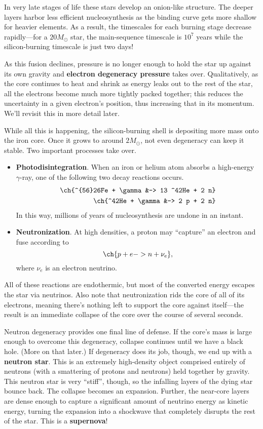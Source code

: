 \documentclass[../a062main.tex]{subfiles}
\begin{document}
In very late stages of life these stars develop an onion-like structure.
The deeper layers harbor less efficient nucleosynthesis as the binding curve gets more shallow for heavier elements.
As a result, the timescales for each burning stage decrease rapidly---for a $20M_\odot$ star, the main-sequence timescale is $10^{7}$ years while the silicon-burning timescale is just two days!

As this fusion declines, pressure is no longer enough to hold the star up against its own gravity and \textbf{electron degeneracy pressure} takes over.
Qualitatively, as the core continues to heat and shrink as energy leaks out to the rest of the star, all the electrons become much more tightly packed together; this reduces the uncertainty in a given electron's position, thus increasing that in its momentum.
We'll revisit this in more detail later.

While all this is happening, the silicon-burning shell is depositing more mass onto the iron core.
Once it grows to around $2M_\odot$, not even degeneracy can keep it stable.
Two important processes take over.
\begin{itemize}
    \item \textbf{Photodisintegration}.
    When an iron or helium atom absorbs a high-energy $\gamma$-ray, one of the following two decay reactions occurs.
    \begin{align*}
        \ch{^{56}26Fe + \gamma &-> 13 ^42He + 2 n} \\
        \ch{^42He + \gamma &-> 2 p + 2 n}
    \end{align*}
    In this way, millions of years of nucleosynthesis are undone in an instant.

    \item \textbf{Neutronization}.
    At high densities, a proton may ``capture'' an electron and fuse according to
    \[ \ch{p + e -> n + \nu_e}, \]
    where $\nu_e$ is an electron neutrino.
\end{itemize}
All of these reactions are endothermic, but most of the converted energy escapes the star via neutrinos.
Also note that neutronization rids the core of all of its electrons, meaning there's nothing left to support the core against itself---the result is an immediate collapse of the core over the course of several seconds.

Neutron degeneracy provides one final line of defense.
If the core's mass is large enough to overcome this degeneracy, collapse continues until we have a black hole.
(More on that later.)
If degeneracy does its job, though, we end up with a \textbf{neutron star}.
This is an extremely high-density object comprised entirely of neutrons (with a smattering of protons and neutrons) held together by gravity.
This neutron star is very ``stiff'', though, so the infalling layers of the dying star bounce back.
The collapse becomes an expansion.
Further, the near-core layers are dense enough to capture a significant amount of neutrino energy as kinetic energy, turning the expansion into a shockwave that completely disrupts the rest of the star.
This is a \textbf{supernova}!
\end{document}
